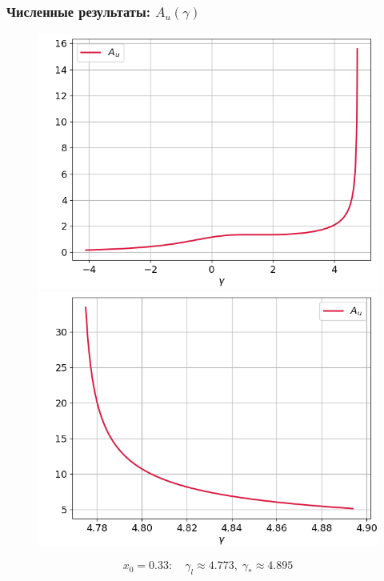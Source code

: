 \documentclass[fullscreen=true, unicode, bookmarks=false]{beamer}
\begin{document}
\begin{frame}
\frametitle{ Численные результаты: $ A_u(\gamma) $ }

\begin{figure} 
\includegraphics[scale=0.37]{divergent_amplitude_13_1.png}  
\hfill
\includegraphics[scale=0.37]{divergent_amplitude_13_2.png}  
\end{figure}

$$ x_0 = 0.33: \quad \gamma_l \approx 4.773, \; \gamma_* \approx 4.895 $$

\end{frame}
\end{document}
